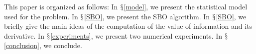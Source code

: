 \documentclass{article} %
\newcommand{\w}{w}
\newcommand{\z}{z}
\newcommand{\pfcomment}[1]{{\color{red} PF: #1}}
\begin{document}


This paper is organized as follows: In $\mathsection$\ref{model}, we present the statistical model used for the problem. In $\mathsection$\ref{SBO},
we present the SBO algorithm. In $\mathsection$\ref{SBO}, we briefly give the main ideas of the computation of the value of information and its derivative. 
In $\mathsection$\ref{experiments}, we present two numerical experiments. In $\mathsection$\ref{conclusion}, we conclude.










\end{document}
